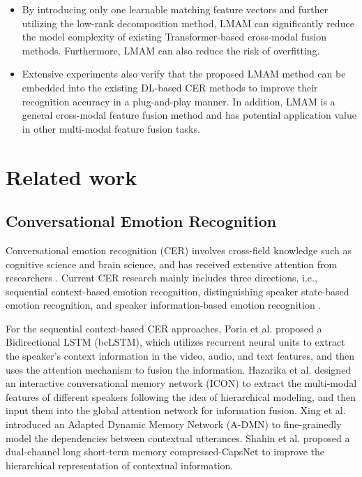 {{\begin{itemize}
	\item By introducing only one learnable matching feature vectors and further utilizing the low-rank decomposition method, LMAM can significantly reduce the model complexity of existing Transformer-based cross-modal fusion methods. Furthermore, LMAM can also reduce the risk of overfitting.
	
	\item Extensive experiments also verify that the proposed LMAM method can be embedded into the existing DL-based CER methods to improve their recognition accuracy in a plug-and-play manner. In addition, LMAM is a general cross-modal feature fusion method and has potential application value in other multi-modal feature fusion tasks.
\end{itemize}

\section{Related work}

\subsection{Conversational Emotion Recognition}
Conversational emotion recognition (CER) involves cross-field knowledge such as cognitive science and brain science, and has received extensive attention from researchers \cite{yang2022hybrid, liu2022social, zhang2024cross}.  Current CER research mainly includes three directions, i.e., sequential context-based emotion recognition, distinguishing speaker state-based emotion recognition, and speaker information-based emotion recognition \cite{li2022contrast}.

For the sequential context-based CER approaches, Poria et al. \cite{poria2017context} proposed a Bidirectional LSTM (bcLSTM), which utilizes recurrent neural units to extract the speaker’s context information in the video, audio, and text features, and then uses the attention mechanism to fusion the information. Hazarika et al. \cite{hazarika2018icon} designed an interactive conversational memory network (ICON) to extract the multi-modal features of different speakers following the idea of hierarchical modeling, and then input them into the global attention network for information fusion. Xing et al. \cite{9128015} introduced an Adapted Dynamic Memory Network (A-DMN) to fine-grainedly model the dependencies between contextual utterances. Shahin et al. \cite{shahin2022novel} proposed a dual-channel long short-term memory compressed-CapsNet to improve the hierarchical representation of contextual information.

}}
